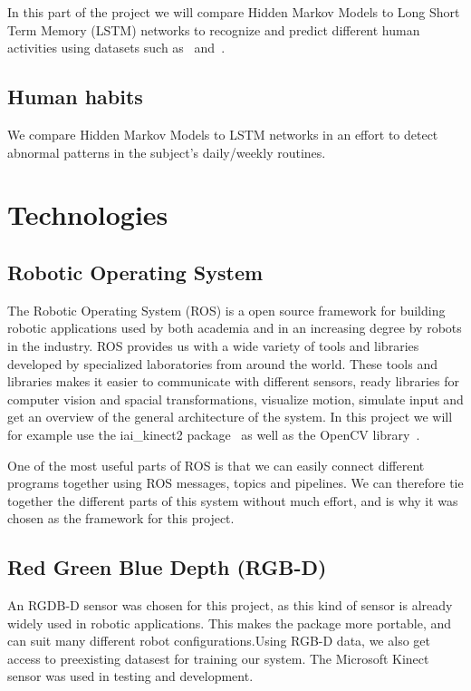 In this part of the project we will compare Hidden Markov Models to Long Short Term Memory (LSTM) networks to recognize and predict different human activities using datasets such as~\cite{sung_rgbdactivity_2012} and~\cite{h36m_pami}.

\subsection{Human habits}
We compare Hidden Markov Models to LSTM networks in an effort to detect abnormal patterns in the subject's daily/weekly routines.

\section{Technologies}
\subsection{Robotic Operating System}
The Robotic Operating System (ROS) is a open source framework for building robotic applications used by both academia and in an increasing degree by robots in the industry. ROS provides us with a wide variety of tools and libraries developed by specialized laboratories from around the world. These tools and libraries makes it easier to communicate with different sensors, ready libraries for computer vision and spacial transformations, visualize motion, simulate input and get an overview of the general architecture of the system.
In this project we will for example use the iai\_kinect2 package~\cite{iai_kinect2} as well as the OpenCV library~\cite{opencv_library}.

One of the most useful parts of ROS is that we can easily connect different programs together using ROS messages, topics and pipelines. We can therefore tie together the different parts of this system without much effort, and is why it was chosen as the framework for this project.



\subsection{Red Green Blue Depth (RGB-D)}
An RGDB-D sensor was chosen for this project, as this kind of sensor is already widely used in robotic applications. This makes the package more portable, and can suit many different robot configurations.Using RGB-D data, we also get access to preexisting datasest for training our system. The Microsoft Kinect sensor was used in testing and development.



